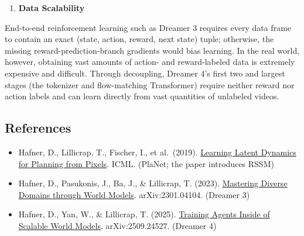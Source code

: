 \begin{enumerate}
\def\labelenumi{\arabic{enumi}.}
\setcounter{enumi}{1}
\tightlist
\item
  \textbf{Data Scalability}
\end{enumerate}

End-to-end reinforcement learning such as Dreamer 3 requires every data frame to contain an exact (state, action, reward, next state) tuple; otherwise, the missing reward-prediction-branch gradients would bias learning. In the real world, however, obtaining vast amounts of action- and reward-labeled data is extremely expensive and difficult. Through decoupling, Dreamer 4's first two and largest stages (the tokenizer and flow-matching Transformer) require neither reward nor action labels and can learn directly from vast quantities of unlabeled videos.

\FloatBarrier
{}
\hypertarget{references-156}{%
\subsection{References}\label{references-156}}

\vspace{0.25em}
\begin{itemize}
\tightlist
\item
  Hafner, D., Lillicrap, T., Fischer, I., et al.~(2019). \href{https://arxiv.org/abs/1811.04551}{Learning Latent Dynamics for Planning from Pixels}. ICML. (PlaNet; the paper introduces RSSM)
\item
  Hafner, D., Pasukonis, J., Ba, J., \& Lillicrap, T. (2023). \href{https://arxiv.org/abs/2301.04104}{Mastering Diverse Domains through World Models}. arXiv:2301.04104. (Dreamer 3)
\item
  Hafner, D., Yan, W., \& Lillicrap, T. (2025). \href{https://arxiv.org/abs/2509.24527}{Training Agents Inside of Scalable World Models}. arXiv:2509.24527. (Dreamer 4)
\end{itemize}

\clearpage
